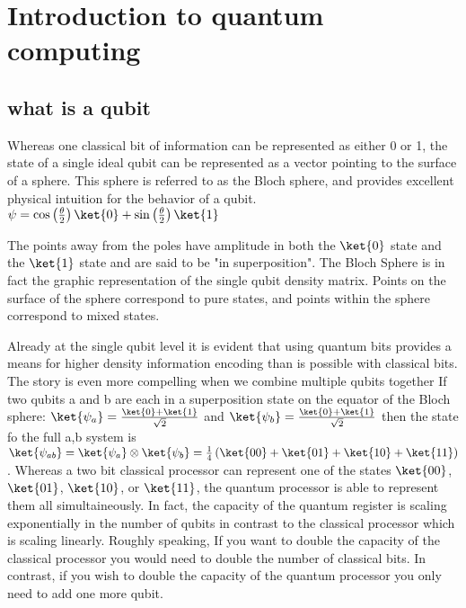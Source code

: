 \chapter{Introduction to quantum computing}
\section{what is a qubit}

Whereas one classical bit of information can be represented as either 0 or 1, the state of a single ideal qubit can be represented as a vector pointing to the surface of a sphere.
This sphere is referred to as the Bloch sphere, and provides excellent physical intuition for the behavior of a qubit.
{
}
{}
$\psi = \cos \left( \frac{\theta}{2} \right) \ket{0} + \sin \left( \frac{\theta}{2} \right)\ket{1} $

The points away from the poles have amplitude in both the $\ket{0}$ state and the $\ket{1}$ state and are said to be "in superposition".
The Bloch Sphere is in fact the graphic representation of the single qubit density matrix.
Points on the surface of the sphere correspond to pure states, and points within the sphere correspond to mixed states.

Already at the single qubit level it is evident that using quantum bits provides a means for higher density information encoding than is possible with classical bits.
The story is even more compelling when we combine multiple qubits together
If two qubits a and b are each in a superposition state on the equator of the Bloch sphere:
$\ket{\psi_a} = \frac{\ket{0}+\ket{1}}{\sqrt{2}}$ and $\ket{\psi_b} = \frac{\ket{0}+\ket{1}}{\sqrt{2}}$
then the state fo the full a,b system is
$\ket{\psi_{ab}} = \ket{\psi_a} \otimes \ket{\psi_b} = \frac{1}{4} \left( \ket{00} + \ket{01} + \ket{10} + \ket{11} \right)$.
Whereas a two bit classical processor can represent one of the states $\ket{00}$, $\ket{01}$, $\ket{10}$, or $\ket{11}$, the quantum processor is able to represent them all simultaineously.
In fact, the capacity of the quantum register is scaling exponentially in the number of qubits in contrast to the classical processor which is scaling linearly.
Roughly speaking, If you want to double the capacity of the classical processor you would need to double the number of classical bits.
In contrast, if you wish to double the capacity of the quantum processor you only need to add one more qubit.

